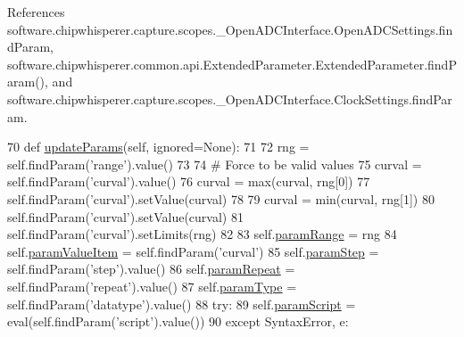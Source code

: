 References software.\+chipwhisperer.\+capture.\+scopes.\+\_\+\+Open\+A\+D\+C\+Interface.\+Open\+A\+D\+C\+Settings.\+find\+Param, software.\+chipwhisperer.\+common.\+api.\+Extended\+Parameter.\+Extended\+Parameter.\+find\+Param(), and software.\+chipwhisperer.\+capture.\+scopes.\+\_\+\+Open\+A\+D\+C\+Interface.\+Clock\+Settings.\+find\+Param.


\begin{DoxyCode}
70     \textcolor{keyword}{def }\hyperlink{classsoftware_1_1chipwhisperer_1_1capture_1_1utils_1_1GlitchExplorerDialog_1_1TuningParameter_a5c70a74b2dcc86730bf403b5e8d17f64}{updateParams}(self, ignored=None):
71 
72         rng = self.findParam(\textcolor{stringliteral}{'range'}).value()
73 
74         \textcolor{comment}{# Force to be valid values}
75         curval = self.findParam(\textcolor{stringliteral}{'curval'}).value()
76         curval = max(curval, rng[0])
77         self.findParam(\textcolor{stringliteral}{'curval'}).setValue(curval)
78 
79         curval = min(curval, rng[1])
80         self.findParam(\textcolor{stringliteral}{'curval'}).setValue(curval)
81         self.findParam(\textcolor{stringliteral}{'curval'}).setLimits(rng)
82 
83         self.\hyperlink{classsoftware_1_1chipwhisperer_1_1capture_1_1utils_1_1GlitchExplorerDialog_1_1TuningParameter_a1b6d2b9d82fe104bcb629514b512ddcf}{paramRange} = rng
84         self.\hyperlink{classsoftware_1_1chipwhisperer_1_1capture_1_1utils_1_1GlitchExplorerDialog_1_1TuningParameter_ab9a9db11ed61589673e547a9a8d8b836}{paramValueItem} = self.findParam(\textcolor{stringliteral}{'curval'})
85         self.\hyperlink{classsoftware_1_1chipwhisperer_1_1capture_1_1utils_1_1GlitchExplorerDialog_1_1TuningParameter_ad9354e49137895c1c4c0a95fda90dc5e}{paramStep} = self.findParam(\textcolor{stringliteral}{'step'}).value()
86         self.\hyperlink{classsoftware_1_1chipwhisperer_1_1capture_1_1utils_1_1GlitchExplorerDialog_1_1TuningParameter_a2cda1f9774aa60e6f9a821c4399775ff}{paramRepeat} = self.findParam(\textcolor{stringliteral}{'repeat'}).value()
87         self.\hyperlink{classsoftware_1_1chipwhisperer_1_1capture_1_1utils_1_1GlitchExplorerDialog_1_1TuningParameter_a3ad2982e5c45b59e3f439283b55099d3}{paramType} = self.findParam(\textcolor{stringliteral}{'datatype'}).value()
88         \textcolor{keywordflow}{try}:
89             self.\hyperlink{classsoftware_1_1chipwhisperer_1_1capture_1_1utils_1_1GlitchExplorerDialog_1_1TuningParameter_a1342112caed9f9b294bd1d4680a20b7a}{paramScript} = eval(self.findParam(\textcolor{stringliteral}{'script'}).value())
90         \textcolor{keywordflow}{except} SyntaxError, e:

\end{DoxyCode}
